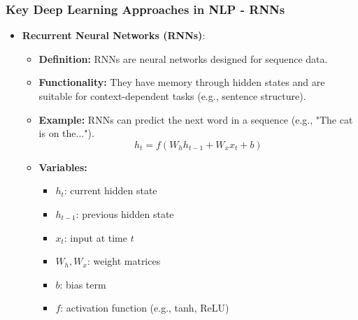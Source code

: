 \documentclass[aspectratio=169]{beamer}
\begin{document}
\begin{frame}[fragile]
    \frametitle{Key Deep Learning Approaches in NLP - RNNs}
    \begin{itemize}
        \item \textbf{Recurrent Neural Networks (RNNs)}:
        \begin{itemize}
            \item \textbf{Definition:} RNNs are neural networks designed for sequence data.
            \item \textbf{Functionality:} They have memory through hidden states and are suitable for context-dependent tasks (e.g., sentence structure).
            \item \textbf{Example:} RNNs can predict the next word in a sequence (e.g., "The cat is on the...").
            \begin{equation}
            h_t = f(W_h h_{t-1} + W_x x_t + b)
            \end{equation}
            \item \textbf{Variables:}
            \begin{itemize}
                \item $h_t$: current hidden state
                \item $h_{t-1}$: previous hidden state
                \item $x_t$: input at time $t$
                \item $W_h, W_x$: weight matrices
                \item $b$: bias term
                \item $f$: activation function (e.g., tanh, ReLU)
            \end{itemize}
        \end{itemize}
    \end{itemize}
\end{frame}
\end{document}
